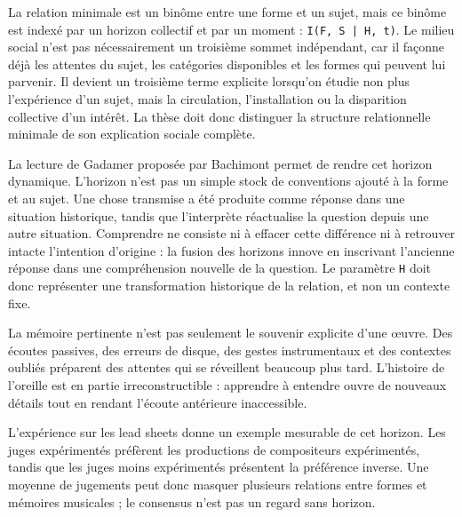 \documentclass[10pt,a4paper]{article}
\begin{document}
La relation minimale est un binôme entre une forme et un sujet, mais ce binôme est indexé par un horizon collectif et par un moment : \texttt{I(F, S | H, t)}. Le milieu social n'est pas nécessairement un troisième sommet indépendant, car il façonne déjà les attentes du sujet, les catégories disponibles et les formes qui peuvent lui parvenir. Il devient un troisième terme explicite lorsqu'on étudie non plus l'expérience d'un sujet, mais la circulation, l'installation ou la disparition collective d'un intérêt. La thèse doit donc distinguer la structure relationnelle minimale de son explication sociale complète.

La lecture de Gadamer proposée par Bachimont permet de rendre cet horizon dynamique. L'horizon n'est pas un simple stock de conventions ajouté à la forme et au sujet. Une chose transmise a été produite comme réponse dans une situation historique, tandis que l'interprète réactualise la question depuis une autre situation. Comprendre ne consiste ni à effacer cette différence ni à retrouver intacte l'intention d'origine : la fusion des horizons innove en inscrivant l'ancienne réponse dans une compréhension nouvelle de la question. Le paramètre \texttt{H} doit donc représenter une transformation historique de la relation, et non un contexte fixe.

La mémoire pertinente n'est pas seulement le souvenir explicite d'une œuvre. Des écoutes passives, des erreurs de disque, des gestes instrumentaux et des contextes oubliés préparent des attentes qui se réveillent beaucoup plus tard. L'histoire de l'oreille est en partie irreconstructible : apprendre à entendre ouvre de nouveaux détails tout en rendant l'écoute antérieure inaccessible.

L'expérience sur les lead sheets donne un exemple mesurable de cet horizon. Les juges expérimentés préfèrent les productions de compositeurs expérimentés, tandis que les juges moins expérimentés présentent la préférence inverse. Une moyenne de jugements peut donc masquer plusieurs relations entre formes et mémoires musicales ; le consensus n'est pas un regard sans horizon.
\end{document}
